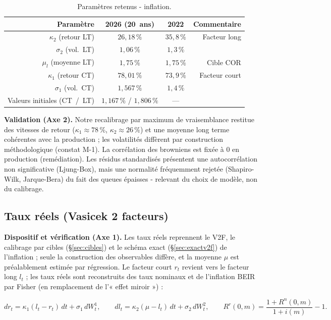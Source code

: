 \documentclass[11pt,a4paper]{article}
\renewcommand{\arraystretch}{1.4}
\newcommand{\tablehead}[1]{\textcolor{nxnavy}{\sffamily\bfseries\small #1}}
\begin{document}
\begin{table}[H]
\centering\small
\renewcommand{\arraystretch}{1.4}\setlength{\tabcolsep}{6pt}
\begin{tabularx}{\linewidth}{R C C R}
\toprule
\tablehead{Paramètre} & \tablehead{2026 (20~ans)} & \tablehead{2022} & \tablehead{Commentaire} \\
\midrule
{} $\kappa_2$ (retour LT) & $26{,}18\,\%$ & $35{,}8\,\%$ & Facteur long \\
$\sigma_2$ (vol.\ LT) & $1{,}06\,\%$ & $1{,}3\,\%$ & \\
 $\mu_l$ (moyenne LT) & $1{,}75\,\%$ & $1{,}75\,\%$ & Cible COR \\
$\kappa_1$ (retour CT) & $78{,}01\,\%$ & $73{,}9\,\%$ & Facteur court \\
 $\sigma_1$ (vol.\ CT) & $1{,}567\,\%$ & $1{,}4\,\%$ & \\
Valeurs initiales (CT~/~LT) & $1{,}167\,\%$ / $1{,}806\,\%$ & --- & \\
\bottomrule
\end{tabularx}
\caption{Paramètres retenus - inflation.}
\end{table}

\textbf{Validation (Axe 2).} Notre recalibrage par maximum de vraisemblance restitue des vitesses de retour ($\kappa_1\approx78\,\%$, $\kappa_2\approx26\,\%$) et une moyenne long terme cohérentes avec la production ; les volatilités diffèrent par construction méthodologique (constat M-1). La corrélation des browniens est fixée à $0$ en production (remédiation). Les résidus standardisés présentent une autocorrélation non significative (Ljung-Box), mais une normalité fréquemment rejetée (Shapiro-Wilk, Jarque-Bera) du fait des queues épaisses - relevant du choix de modèle, non du calibrage.

\subsection{Taux réels (Vasicek 2 facteurs)}

\textbf{Dispositif et vérification (Axe 1).} Les taux réels reprennent le V2F, le calibrage par cibles (\S\ref{sec:cibles}) et le schéma exact (\S\ref{sec:exactv2f}) de l'inflation ; seule la construction des observables diffère, et la moyenne $\mu$ est préalablement estimée par régression. Le facteur court $r_t$ revient vers le facteur long $l_t$ ; les taux réels sont reconstruits des taux nominaux et de l'inflation BEIR par Fisher (en remplacement de l'« effet miroir ») :
\begin{definitionbox}
\[
dr_t=\kappa_1(l_t-r_t)\,dt+\sigma_1\,dW_t^1,\qquad dl_t=\kappa_2(\mu-l_t)\,dt+\sigma_2\,dW_t^2,\qquad
R^{r}(0,m)=\frac{1+R^{n}(0,m)}{1+i(m)}-1 .
\]
\end{definitionbox}
\end{document}
